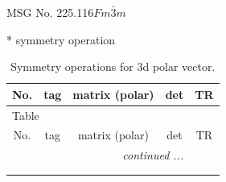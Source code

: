 \documentclass[fleqn,8pt]{jsarticle}
\begin{document}
\setcounter{MaxMatrixCols}{32}

\renewcommand{\tablename}{Table~}
\renewcommand{\figurename}{Figure~}
\begin{center}
\LARGE
MSG No. 225.116\quad$Fm\bar{3}m$
\end{center}
* symmetry operation
\renewcommand{\arraystretch}{1.3}
\begin{longtable}{ccccc}
\caption{Symmetry operations for 3d polar vector.}
 \\
 \hline \hline
No. & tag & matrix (polar) & det & TR \\ \hline \endfirsthead

\multicolumn{4}{l}{\tablename\ \thetable{}} \\
 \hline \hline
No. & tag & matrix (polar) & det & TR \\ \hline \endhead

 \hline \hline
\multicolumn{4}{r}{\footnotesize\it continued ...} \\ \endfoot

 \hline \hline
\multicolumn{4}{r}{} \\ \endlastfoot


\end{longtable}
\end{document}
